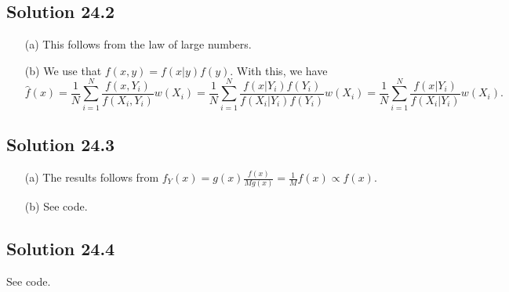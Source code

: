 \subsection*{Solution 24.2}

\begin{itemize}
    \item[(a)] This follows from the law of large numbers.
    \item[(b)] We use that $f(x, y) = f(x|y) f(y)$.
        With this, we have
        \begin{equation*}
            \hat{f}(x) = \frac{1}{N} \sum_{i = 1}^N \frac{f(x, Y_i)}{f(X_i, Y_i)} w(X_i)
                = \frac{1}{N} \sum_{i = 1}^N \frac{f(x|Y_i) f(Y_i)}{f(X_i|Y_i) f(Y_i)} w(X_i)
                = \frac{1}{N} \sum_{i = 1}^N \frac{f(x|Y_i)}{f(X_i|Y_i)} w(X_i).
        \end{equation*}
\end{itemize}


\subsection*{Solution 24.3}

\begin{itemize}
    \item[(a)] The results follows from $f_Y(x) = g(x) \frac{f(x)}{M g(x)} = \frac{1}{M} f(x) \propto f(x)$.
    \item[(b)] See code.
\end{itemize}


\subsection*{Solution 24.4}

See code.
